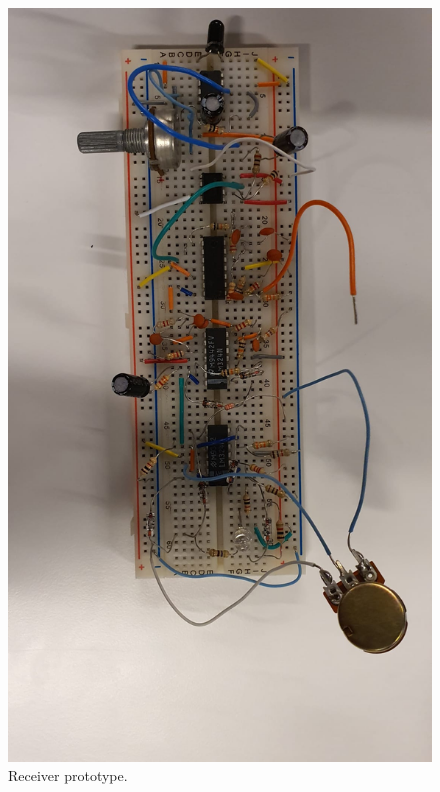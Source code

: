 \documentclass[a4paper,10pt]{IEEEtran}
\begin{document}
\begin{figure}[htbp!]
    \centering
    \includegraphics[width = 1\linewidth]{receiver.jpeg}
    \caption{Receiver prototype.}
    \label{receiver_breadboard}
\end{figure} 
\end{document}
